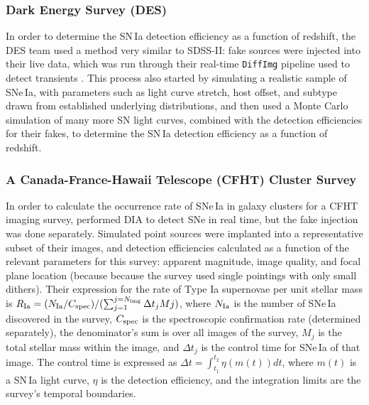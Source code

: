 \subsubsection{Dark Energy Survey (DES)}

In order to determine the SN\,Ia detection efficiency as a function of redshift, the DES team used a method very similar to SDSS-II: fake sources were injected into their live data, which was run through their real-time {\tt DiffImg} pipeline used to detect transients \cite{2015AJ....150..172K}.
This process also started by simulating a realistic sample of SNe\,Ia, with parameters such as light curve stretch, host offset, and subtype drawn from established underlying distributions, and then used a Monte Carlo simulation of many more SN light curves, combined with the detection efficiencies for their fakes, to determine the SN\,Ia detection efficiency as a function of redshift.

\subsubsection{A Canada-France-Hawaii Telescope (CFHT) Cluster Survey}

In order to calculate the occurrence rate of SNe\,Ia in galaxy clusters for a CFHT imaging survey, \cite{2012ApJ...746..163S} performed DIA to detect SNe in real time, but the fake injection was done separately.
Simulated point sources were implanted into a representative subset of their images, and detection efficiencies calculated as a function of the relevant parameters for this survey: apparent magnitude, image quality, and focal plane location (because because the survey used single pointings with only small dithers).
Their expression for the rate of Type Ia supernovae per unit stellar mass is $R_{\rm Ia} = (N_{\rm Ia} / C_{\rm spec}) / ( \sum_{j=1}^{j=N_{\rm img}} \Delta t_j Mj )$, where $N_{\rm Ia}$ is the number of SNe\,Ia discovered in the survey, $C_{\rm spec}$ is the spectroscopic confirmation rate (determined separately), the denominator's sum is over all images of the survey, $M_j$ is the total stellar mass within the image, and $\Delta t_j$ is the control time for SNe\,Ia of that image.
The control time is expressed as $\Delta t = \int_{t_1}^{t_2} \eta(m(t)) dt$, where $m(t)$ is a SN\,Ia light curve, $\eta$ is the detection efficiency, and the integration limits are the survey's temporal boundaries.

